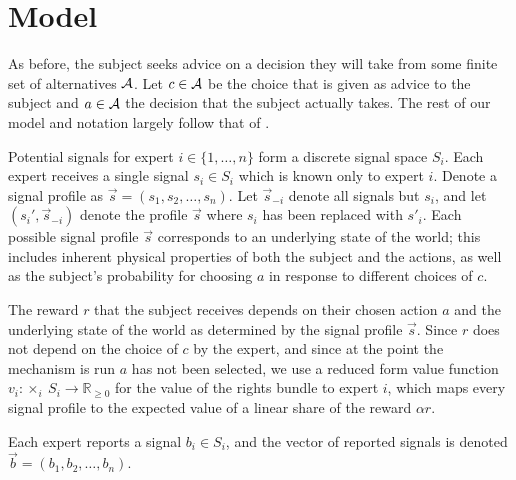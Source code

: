 \section{Model}



As before, the subject seeks advice on a decision they will take from some finite set of alternatives ${\mathcal A}$. Let $c\in{\mathcal A}$ be the choice that is given as advice to the subject and $a\in{\mathcal A}$ the decision that the subject actually takes.
The rest of our model and notation largely follow that of \citep{eden2018interdependent}. %

Potential signals for expert $i \in \{1, \ldots, n\}$ form a discrete signal space $S_i$.
Each expert receives a single signal $s_i\in S_i$ which is known only to expert $i$.
Denote a signal profile as $\vec{s}=(s_1,s_2,\ldots,s_n)$.
Let $\vec{s}_{-i}$ denote all signals but $s_i$, and let $(s_i',\vec{s}_{-i})$ denote the profile $\vec{s}$ where $s_i$ has been replaced with $s'_i$.
Each possible signal profile $\vec{s}$ corresponds to an underlying state of the world; this includes inherent physical properties of both the subject and the actions, as well as the subject's probability for choosing $a$ in response to different choices of $c$.

The reward $r$ that the subject receives depends on their chosen action $a$ and the underlying state of the world as determined by the signal profile $\vec{s}$.
Since $r$ does not depend on the choice of $c$ by the expert, and since at the point the mechanism is run $a$ has not been selected, we use a reduced form  value function $v_i: \times_i \ S_i \rightarrow \mathbb{R}_{\geq 0}$ for the value of the rights bundle to expert $i$, which maps every signal profile to the expected value of a linear share of the reward  $\alpha r$.


Each expert reports a signal $b_i\in S_i$, and the vector of reported signals is denoted $\vec{b}=( b_1, b_2, \ldots, b_n)$.

